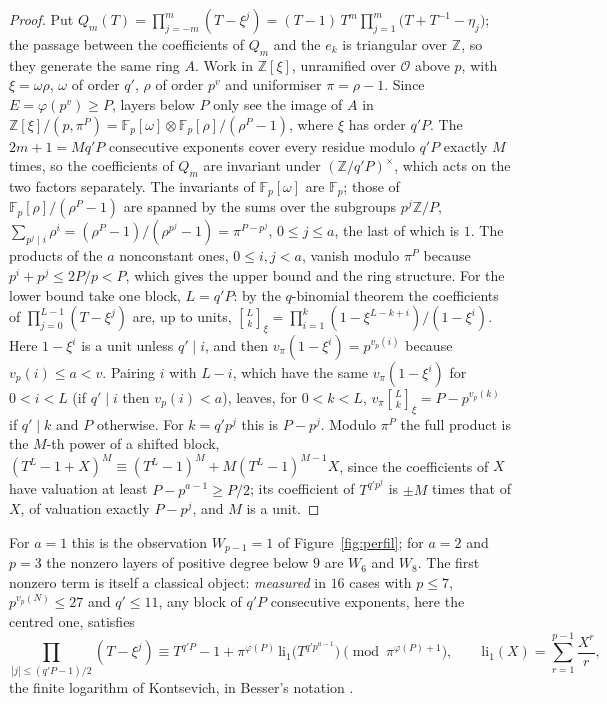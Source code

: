 \documentclass[11pt,a4paper]{article}
\theoremstyle{definition}
\newcommand{\ZZ}{\mathbb{Z}}
\newcommand{\FF}{\mathbb{F}}
\newcommand{\cO}{\mathcal{O}}
\begin{document}
\begin{proof}
Put $Q_m(T)=\prod_{j=-m}^m(T-\xi^j)=(T-1)\,T^m\prod_{j=1}^m\bigl(T+T^{-1}-\eta_j\bigr)$; the passage between the
coefficients of $Q_m$ and the $e_k$ is triangular over $\ZZ$, so they generate the same ring $A$. Work in $\ZZ[\xi]$,
unramified over $\cO$ above $p$, with $\xi=\omega\rho$, $\omega$ of order $q'$, $\rho$ of order $p^v$ and uniformiser
$\pi=\rho-1$. Since $E=\varphi(p^v)\ge P$, layers below $P$ only see the image of $A$ in $\ZZ[\xi]/(p,\pi^P)
=\FF_p[\omega]\otimes\FF_p[\rho]/(\rho^P-1)$, where $\xi$ has order $q'P$. The $2m+1=Mq'P$ consecutive exponents cover
every residue modulo $q'P$ exactly $M$ times, so the coefficients of $Q_m$ are invariant under $(\ZZ/q'P)^\times$,
which acts on the two factors separately. The invariants of $\FF_p[\omega]$ are $\FF_p$; those of $\FF_p[\rho]/(\rho^P-1)$
are spanned by the sums over the subgroups $p^j\ZZ/P$, $\sum_{p^j\mid i}\rho^i=(\rho^P-1)/(\rho^{p^j}-1)=\pi^{P-p^j}$,
$0\le j\le a$, the last of which is $1$. The products of the $a$ nonconstant ones, $0\le i,j<a$, vanish modulo
$\pi^P$ because $p^i+p^j\le2P/p<P$, which gives the upper bound and the ring structure. For the lower
bound take one block, $L=q'P$: by the $q$-binomial theorem the coefficients of $\prod_{j=0}^{L-1}(T-\xi^j)$ are, up to
units, $\genfrac{[}{]}{0pt}{}{L}{k}_\xi=\prod_{i=1}^k(1-\xi^{L-k+i})/(1-\xi^i)$. Here $1-\xi^i$ is a unit unless $q'\mid i$, and then
$v_\pi(1-\xi^i)=p^{v_p(i)}$ because $v_p(i)\le a<v$. Pairing $i$ with $L-i$, which have the same $v_\pi(1-\xi^i)$ for $0<i<L$
(if $q'\mid i$ then $v_p(i)<a$), leaves, for $0<k<L$, $v_\pi\genfrac{[}{]}{0pt}{}{L}{k}_\xi=P-p^{v_p(k)}$ if $q'\mid k$ and $P$ otherwise. For $k=q'p^j$ this is
$P-p^j$. Modulo $\pi^P$ the full product is the $M$-th power of a shifted block, $(T^L-1+X)^M\equiv(T^L-1)^M+
M(T^L-1)^{M-1}X$, since the coefficients of $X$ have valuation at least $P-p^{a-1}\ge P/2$; its coefficient of
$T^{q'p^j}$ is $\pm M$ times that of $X$, of valuation exactly $P-p^j$, and $M$ is a unit.
\end{proof}

\noindent For $a=1$ this is the observation $W_{p-1}=1$ of Figure~\ref{fig:perfil}; for $a=2$ and $p=3$ the nonzero
layers of positive degree below $9$ are $W_6$ and $W_8$. The first nonzero term is itself a classical object: \emph{measured} in $16$
cases with $p\le7$, $p^{v_p(N)}\le27$ and $q'\le11$, any block of $q'P$ consecutive exponents, here the centred one, satisfies
\[
\prod_{|j|\le(q'P-1)/2}(T-\xi^j)\equiv T^{q'P}-1+\pi^{\varphi(P)}\,\mathrm{li}_1\bigl(T^{q'p^{a-1}}\bigr)
\pmod{\pi^{\varphi(P)+1}},\qquad \mathrm{li}_1(X)=\sum_{r=1}^{p-1}\frac{X^r}{r},
\]
the finite logarithm of Kontsevich, in Besser's notation \cite{Bes02}.
\end{document}
